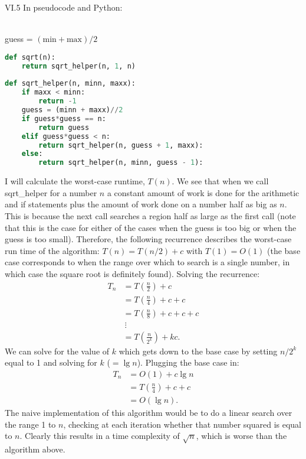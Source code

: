 \begin{problem}{VI.5} In pseudocode and Python:


\begin{algorithmic}[0]
  \EndFunction
  \\
  
     
    \EndIf
    \State guess = $(\text{min} + \text{max})/2$
      
     \Else
    \EndIf
  \EndFunction
\end{algorithmic}

\begin{lstlisting}[language=Python]
def sqrt(n):
	return sqrt_helper(n, 1, n)
	
def sqrt_helper(n, minn, maxx):
	if maxx < minn:
		return -1
	guess = (minn + maxx)//2
	if guess*guess == n:
		return guess
	elif guess*guess < n:
		return sqrt_helper(n, guess + 1, maxx):
	else:
		return sqrt_helper(n, minn, guess - 1):
\end{lstlisting}
I will calculate the worst-case runtime, $T(n)$.  We see that when we call sqrt\_helper for a number $n$ a constant amount of work is done for the arithmetic and if statements plus the amount of work done on a number half as big as $n$.  This is because the next call searches a region half as large as the first call (note that this is the case for either of the cases when the guess is too big or when the guess is too small).  Therefore, the following recurrence describes the worst-case run time of the algorithm: $T(n) = T(n/2)+c$ with $T(1) = O(1)$ (the base case corresponds to when the range over which to search is a single number, in which case the square root is definitely found).  Solving the recurrence:
\begin{align*}
   T_{n} &= T\left(\frac{n}{2}\right) + c \\
    &= T\left(\frac{n}{4}\right) + c +c\\
    &= T\left(\frac{n}{8}\right) + c +c+c\\
   &~\vdots\\
   &= T\left(\frac{n}{2^k}\right) + kc.
\end{align*}
We can solve for the value of $k$ which gets down to the base case by setting $n/2^k$ equal to 1 and solving for $k$ ($ = \lg n$).  Plugging the base case in:
\begin{align*}
   T_{n} &= O(1) + c \lg n \\
    &= T\left(\frac{n}{4}\right) + c +c\\
    &= O(\lg n).
\end{align*}
The naive implementation of this algorithm would be to do a linear search over the range 1 to $n$, checking at each iteration whether that number squared is equal to $n$.  Clearly this results in a time complexity of $\sqrt{n}$, which is worse than the algorithm above.


\end{problem}



